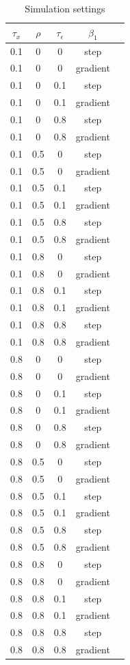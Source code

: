 \documentclass[authoryear, review, 11pt]{elsarticle}
\begin{document}
		\begin{table}[ht]
			\caption{Simulation settings} %
			\vspace{1mm}
			\centering  %
			\begin{tabular}{c c c c c} %
			\hline\hline                        %
			$\tau_x$ & $\rho$ & $\tau_\epsilon$ & $\beta_1$ \\ %
			\hline                  %
			0.1 & 0 & 0 & step \\
			0.1 & 0 & 0 & gradient \\
			0.1 & 0 & 0.1 & step \\
			0.1 & 0 & 0.1 & gradient \\
			0.1 & 0 & 0.8 & step \\
			0.1 & 0 & 0.8 & gradient \\
			0.1 & 0.5 & 0 & step \\
			0.1 & 0.5 & 0 & gradient \\
			0.1 & 0.5 & 0.1 & step \\
			0.1 & 0.5 & 0.1 & gradient \\
			0.1 & 0.5 & 0.8 & step \\
			0.1 & 0.5 & 0.8 & gradient \\
			0.1 & 0.8 & 0 & step \\
			0.1 & 0.8 & 0 & gradient \\
			0.1 & 0.8 & 0.1 & step \\
			0.1 & 0.8 & 0.1 & gradient \\
			0.1 & 0.8 & 0.8 & step \\
			0.1 & 0.8 & 0.8 & gradient \\				
			0.8 & 0 & 0 & step \\
			0.8 & 0 & 0 & gradient \\
			0.8 & 0 & 0.1 & step \\
			0.8 & 0 & 0.1 & gradient \\
			0.8 & 0 & 0.8 & step \\
			0.8 & 0 & 0.8 & gradient \\
			0.8 & 0.5 & 0 & step \\
			0.8 & 0.5 & 0 & gradient \\
			0.8 & 0.5 & 0.1 & step \\
			0.8 & 0.5 & 0.1 & gradient \\
			0.8 & 0.5 & 0.8 & step \\
			0.8 & 0.5 & 0.8 & gradient \\
			0.8 & 0.8 & 0 & step \\
			0.8 & 0.8 & 0 & gradient \\
			0.8 & 0.8 & 0.1 & step \\
			0.8 & 0.8 & 0.1 & gradient \\
			0.8 & 0.8 & 0.8 & step \\
			0.8 & 0.8 & 0.8 & gradient \\						

			\hline %
			\end{tabular}
			\label{table:simulation_settings} %
		\end{table}
		
\end{document}
